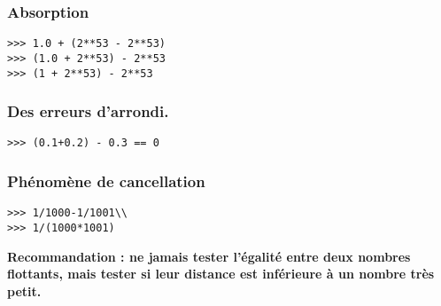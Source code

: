 
\subsubsection*{Absorption}

\begin{lstlisting}
>>> 1.0 + (2**53 - 2**53)
>>> (1.0 + 2**53) - 2**53
>>> (1 + 2**53) - 2**53
\end{lstlisting}

\subsubsection*{Des erreurs d'arrondi.}

\begin{lstlisting}
>>> (0.1+0.2) - 0.3 == 0
\end{lstlisting}

\subsubsection*{Phénomène de cancellation}

\begin{lstlisting}
>>> 1/1000-1/1001\\
>>> 1/(1000*1001)
\end{lstlisting}

\textbf{Recommandation : ne jamais tester l'égalité entre deux nombres flottants, mais tester si leur distance est inférieure à un nombre très petit.}

